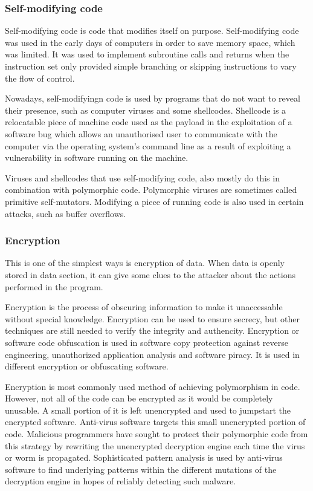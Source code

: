 \documentclass[a4paper,12pt]{article}
\begin{document}
\subsubsection{Self-modifying code}
    Self-modifying code is code that modifies itself on purpose.
    Self-modifying code was used in the early days of computers in order to
    save memory space, which was limited. It was  used to implement subroutine
    calls and returns when the instruction set only provided simple branching
    or skipping instructions to vary the flow of control.

    Nowadays, self-modifyingn code is used by programs that do not want to
    reveal their presence, such as computer viruses and some shellcodes.
    Shellcode is a relocatable piece of machine code used as the payload in
    the exploitation of a software bug which allows an unauthorised user to
    communicate with the computer via the operating system's command line
    as a result of exploiting a vulnerability in software running on the
    machine.

    Viruses and shellcodes that use self-modifying code, also mostly do this
    in combination with polymorphic code. Polymorphic viruses are sometimes
    called primitive self-mutators. Modifying a piece of running code is
    also used in certain attacks, such as buffer overflows.

\subsubsection{Encryption}
    This is one of the simplest ways is encryption of data. When data is openly
    stored in data section, it can give some clues to the attacker about the
    actions performed in the program.

    Encryption is the process of obscuring information to make it unaccessable
    without special knowledge. Encryption can be used to ensure secrecy, but
    other techniques are still needed to verify the integrity and authencity.
    Encryption or software code obfuscation is used in software copy protection
    against reverse engineering, unauthorized application analysis and software
    piracy. It is used in different encryption or obfuscating software.

    Encryption is most commonly used method of achieving polymorphism in code.
    However, not all of the code can be encrypted as it would be completely
    unusable. A small portion of it is left unencrypted and used to jumpstart
    the encrypted software. Anti-virus software targets this small
    unencrypted portion of code. Malicious programmers have sought to protect
    their polymorphic code from this strategy by rewriting the unencrypted
    decryption engine each time the virus or worm is propagated. Sophisticated
    pattern analysis is used by anti-virus software to find underlying
    patterns within the different mutations of the decryption engine in hopes
    of reliably detecting such malware.
\end{document}
